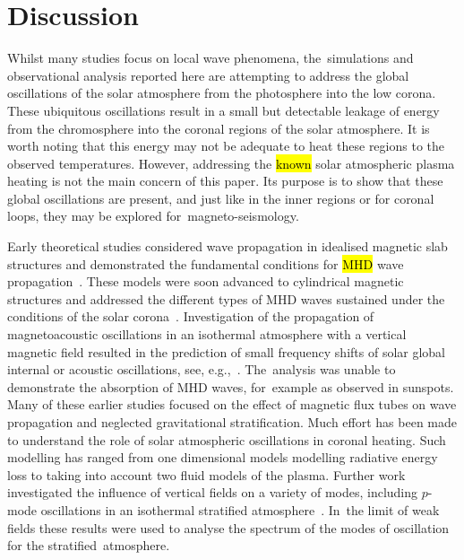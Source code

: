 \documentclass[physics,article,accept,pdftex,moreauthors]{Definitions/mdpi}
\begin{document}
\section{Discussion}
Whilst many studies focus on local wave phenomena, the~simulations and observational analysis reported here are attempting to address the global oscillations of the solar atmosphere from the photosphere into the low corona. These ubiquitous oscillations result in a small but detectable leakage of energy from the chromosphere  into the coronal regions of the solar atmosphere. It is worth noting that this energy may not be adequate to heat these regions to the observed temperatures. However, addressing the 
 \hl{known}   
solar atmospheric plasma heating is not the main concern of this paper. Its purpose is to show that these global oscillations are present, and just like in the inner regions or for coronal loops, they may be explored for~magneto-seismology.

Early theoretical studies   considered wave propagation in idealised magnetic slab structures and demonstrated the fundamental conditions for  
 \hl{MHD} %
wave propagation~\cite{Roberts1981a,Roberts1981b}. These models were soon advanced to cylindrical magnetic structures and addressed 
the different types of MHD waves sustained under the conditions of the solar corona~\cite{EdwinandRoberts1983}.  Investigation of the propagation of magnetoacoustic oscillations in an isothermal atmosphere with a vertical magnetic field resulted in the prediction of small frequency shifts of solar global internal or acoustic oscillations, see, e.g.,~\cite{Hindman1996}. The~analysis was unable to demonstrate the absorption of MHD waves,  for~example as observed in sunspots. Many of these  earlier studies  focused on the effect of magnetic flux tubes on wave propagation and neglected gravitational stratification. Much effort has been made to understand the role of solar atmospheric oscillations in coronal heating. Such modelling has ranged from one dimensional models modelling radiative energy loss to %
  taking into account two fluid models of the plasma. Further work investigated the influence of vertical fields on a variety of modes, including $p$-mode oscillations in an isothermal stratified atmosphere~\cite{Hasan1992}. In~the limit of weak fields these results were used to analyse the spectrum of the modes of oscillation for the stratified~atmosphere.
\end{document}
